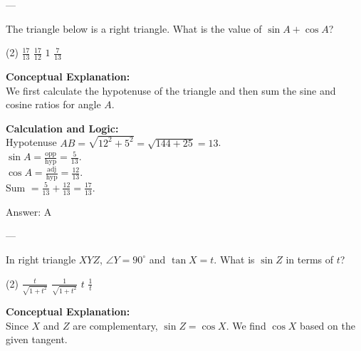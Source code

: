 \documentclass[11pt,paper=a4,answers]{exam}
\begin{document}
\begin{questions}
---

\question
The triangle below is a right triangle. What is the value of $\sin A + \cos A$?
\begin{center}
\end{center}
\begin{tasks}(2)
    \task $\frac{17}{13}$
    \task $\frac{17}{12}$
    \task $1$
    \task $\frac{7}{13}$
\end{tasks}

\begin{solution}
\textbf{Conceptual Explanation:} \\
We first calculate the hypotenuse of the triangle and then sum the sine and cosine ratios for angle $A$.

\vspace{10pt}
\textbf{Calculation and Logic:} \\
Hypotenuse $AB = \sqrt{12^2 + 5^2} = \sqrt{144 + 25} = 13$. \\
$\sin A = \frac{\text{opp}}{\text{hyp}} = \frac{5}{13}$. \\
$\cos A = \frac{\text{adj}}{\text{hyp}} = \frac{12}{13}$. \\
Sum $= \frac{5}{13} + \frac{12}{13} = \frac{17}{13}$.

\vspace{15pt}
Answer: \colorbox{yellow!100}{A}
\end{solution}

---

\question
In right triangle $XYZ$, $\angle Y = 90^\circ$ and $\tan X = t$. What is $\sin Z$ in terms of $t$?
\begin{tasks}(2)
    \task $\frac{t}{\sqrt{1+t^2}}$
    \task $\frac{1}{\sqrt{1+t^2}}$
    \task $t$
    \task $\frac{1}{t}$
\end{tasks}

\begin{solution}
\textbf{Conceptual Explanation:} \\
Since $X$ and $Z$ are complementary, $\sin Z = \cos X$. We find $\cos X$ based on the given tangent.


\end{solution}
\end{questions}
\end{document}
